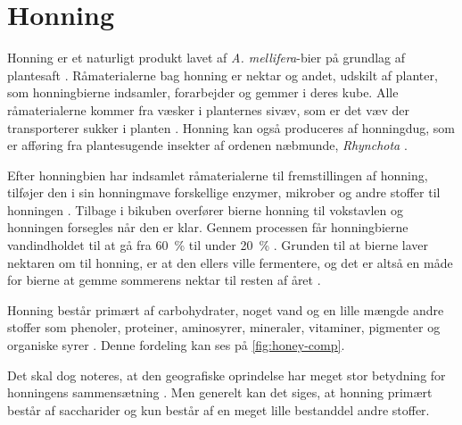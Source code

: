 \chapter{Honning}

Honning er et naturligt produkt lavet af \textit{A. mellifera}-bier på grundlag af plantesaft \parencite{honneyLex}.
Råmaterialerne bag honning er nektar og andet, udskilt af planter, som honningbierne indsamler, forarbejder og gemmer i deres kube.
Alle råmaterialerne kommer fra væsker i planternes sivæv, som er det væv der transporterer sukker i planten \parencite{sivævLex}.
\newline Honning kan også produceres af honningdug, som er afføring fra plantesugende insekter af ordenen næbmunde, \textit{Rhynchota} \parencite{honeybook}.
\par Efter honningbien har indsamlet råmaterialerne til fremstillingen af honning, tilføjer den i sin honningmave forskellige enzymer, mikrober og andre stoffer til honningen \parencite{sugarhoney}.
Tilbage i bikuben overfører bierne honning til vokstavlen og honningen forsegles når den er klar.
Gennem processen får honningbierne vandindholdet til at gå fra \qty{60}{\percent} til under \qty{20}{\percent} \parencite{honeybook}.
Grunden til at bierne laver nektaren om til honning, er at den ellers ville fermentere, og det er altså en måde for bierne at gemme sommerens nektar til resten af året \parencite{honeychem}.
\par Honning består primært af carbohydrater, noget vand og en lille mængde andre stoffer som phenoler, proteiner, aminosyrer, mineraler, vitaminer, pigmenter og organiske syrer \parencite{sugarhoney}.
Denne fordeling kan ses på \cref{fig:honey-comp}.

Det skal dog noteres, at den geografiske oprindelse har meget stor betydning for honningens sammensætning \parencite{geohoney}.
Men generelt kan det siges, at honning primært består af saccharider og kun består af en meget lille bestanddel andre stoffer.
